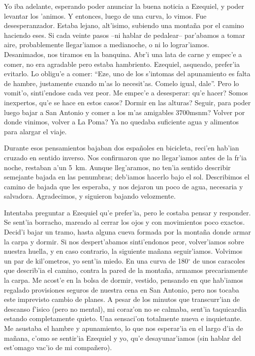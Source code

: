 Yo iba adelante, esperando poder anunciar la buena noticia a Ezequiel, y poder
levantar los 'animos. Y entonces, luego de una curva, lo vimos. Fue
desesperanzador. Estaba lejano, alt'isimo, subiendo una monta\~na por el camino
haciendo eses. Si cada veinte pasos --ni hablar de pedalear-- par'abamos a
tomar aire, probablemente llegar'iamos a medianoche, o ni lo lograr'iamos.
Desanimados, nos tiramos en la banquina. Abr'i una lata de carne y empec'e a
comer, no era agradable pero estaba hambriento. Ezequiel, asqueado, prefer'ia
evitarlo. Lo obligu'e a comer: ``Eze, uno de los s'intomas del apunamiento es
falta de hambre, justamente cuando m'as lo necesit'as. Comelo igual, dale''.
Pero lo vomit'o, sinti'endose cada vez peor. Me empec'e a desesperar:
\textquestiondown qu'e hacer? Somos inexpertos, \textquestiondown qu'e se hace
en estos casos? \textquestiondown Dormir en las alturas? \textquestiondown
Seguir, para poder luego bajar a San Antonio y comer a los m'as amigables
3700msnm? \textquestiondown Volver por donde vinimos, volver a La Poma? Ya no
quedaba suficiente agua y alimentos para alargar el viaje.

Durante esos pensamientos bajaban dos espa\~noles en bicicleta, reci'en hab'ian
cruzado en sentido inverso. Nos confirmaron que no llegar'iamos antes de la
fr'ia noche, restaban a'un 5~km. Aunque lleg'aramos, no ten'ia sentido describir
semejante bajada en las penumbras; deb'iamos hacerlo bajo el sol. Describimos el
camino de bajada que les esperaba, y nos dejaron un poco de agua, necesaria y
salvadora. Agradecimos, y siguieron bajando velozmente.

Intentaba preguntar a Ezequiel qu'e prefer'ia, pero le costaba pensar y
responder. Se sent'ia borracho, mareado al cerrar los ojos y con movimientos
poco exactos. Decid'i bajar un tramo, hasta alguna cueva formada por la
monta\~na donde armar la carpa y dormir. Si nos despert'abamos sinti'endonos
peor, volver'iamos sobre nuestra huella, y en caso contrario, la siguiente
ma\~nana seguir'iamos. Volvimos un par de kil'ometros, yo sent'ia miedo. En una
curva de 180$^\circ$ de unos caracoles que describ'ia el camino, contra la pared
de la monta\~na, armamos precariamente la carpa. Me acost'e en la bolsa de
dormir, vestido, pensando en que hab'iamos regalado provisiones seguros de
nuestra cena en San Antonio, pero nos tocaba este imprevisto cambio de planes. A
pesar de los minutos que transcurr'ian de descanso f'isico (pero no mental), mi
coraz'on no se calmaba, sent'ia taquicardia estando completamente quieto. Una
sensaci'on totalmente nueva e inquietante. Me asustaba el hambre y apunamiento,
lo que nos esperar'ia en el largo d'ia de ma\~nana, c'omo se sentir'ia Ezequiel
y yo, qu'e desayunar'iamos (sin hablar del est'omago vac'io de mi
compa\~nero).

